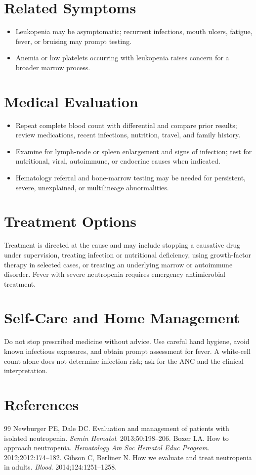 \section*{Related Symptoms}
\begin{itemize}
  \item Leukopenia may be asymptomatic; recurrent infections, mouth ulcers, fatigue, fever, or bruising may prompt testing.
  \item Anemia or low platelets occurring with leukopenia raises concern for a broader marrow process.
\end{itemize}

\section*{Medical Evaluation}
\begin{itemize}
  \item Repeat complete blood count with differential and compare prior results; review medications, recent infections, nutrition, travel, and family history.
  \item Examine for lymph-node or spleen enlargement and signs of infection; test for nutritional, viral, autoimmune, or endocrine causes when indicated.
  \item Hematology referral and bone-marrow testing may be needed for persistent, severe, unexplained, or multilineage abnormalities.
\end{itemize}

\section*{Treatment Options}
Treatment is directed at the cause and may include stopping a causative drug under supervision, treating infection or nutritional deficiency, using growth-factor therapy in selected cases, or treating an underlying marrow or autoimmune disorder. Fever with severe neutropenia requires emergency antimicrobial treatment.

\section*{Self-Care and Home Management}
Do not stop prescribed medicine without advice. Use careful hand hygiene, avoid known infectious exposures, and obtain prompt assessment for fever. A white-cell count alone does not determine infection risk; ask for the ANC and the clinical interpretation.

\section*{References}
\begin{thebibliography}{99}
 Newburger PE, Dale DC. Evaluation and management of patients with isolated neutropenia. \textit{Semin Hematol}. 2013;50:198--206.
 Boxer LA. How to approach neutropenia. \textit{Hematology Am Soc Hematol Educ Program}. 2012;2012:174--182.
 Gibson C, Berliner N. How we evaluate and treat neutropenia in adults. \textit{Blood}. 2014;124:1251--1258.
\end{thebibliography}
